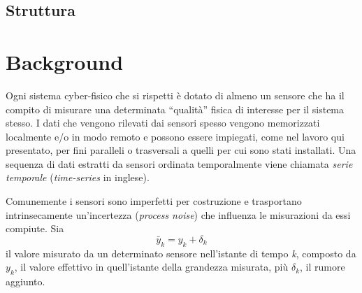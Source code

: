 \documentclass[Lau,binding=0.6cm]{sapthesis}
\begin{document}
\section{Struttura}



\chapter{Background}\label{chap:1}

Ogni sistema cyber-fisico che si rispetti è dotato di almeno un sensore che ha il compito di misurare una determinata ``qualità'' fisica di interesse per il sistema stesso. 
I dati che vengono rilevati dai sensori spesso vengono memorizzati localmente e/o in modo remoto e possono essere impiegati,
come nel lavoro qui presentato, per fini paralleli o trasversali a quelli per cui sono stati installati.
Una sequenza di dati estratti da sensori ordinata temporalmente viene chiamata \textit{serie temporale} (\textit{time-series} in inglese).

Comunemente i sensori sono imperfetti per costruzione e trasportano intrinsecamente un'incertezza (\textit{process noise}) che influenza le misurazioni da essi compiute.
Sia 
\begin{equation}
\bar{y}_{k} = y_{k} + \delta_{k}\label{eq:1}
\end{equation}
il valore misurato da un determinato sensore nell'istante di tempo \textit{k}, composto da $y_k$, il valore effettivo in quell'istante della grandezza misurata, più $\delta_k$, il rumore aggiunto.
\end{document}
